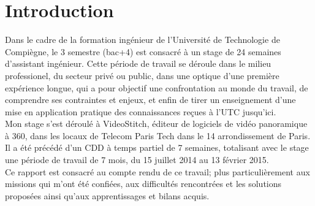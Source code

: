 \chapter*{Introduction}
Dans le cadre de la formation ingénieur de l'Université de Technologie de Compiègne,
le 3 semestre (bac+4) est consacré à un stage de 24 semaines d'assistant ingénieur.
Cette période de travail se déroule dans le milieu professionel, du secteur
privé ou public, dans une optique d'une première expérience longue, qui a pour
objectif une confrontation au monde du travail, de comprendre ses contraintes et 
enjeux, et enfin de tirer un enseignement d'une mise en application pratique des
connaissances reçues à l'UTC jusqu'ici.\\
\newline
Mon stage s'est déroulé à VideoStitch, éditeur de logiciels de vidéo panoramique
à 360\degree, dans les locaux de Telecom Paris Tech dans le 14 arrondissement de Paris. 
Il a été précédé d'un CDD à temps partiel de 7 semaines, totalisant avec le stage une période 
de travail de 7 mois, du 15 juillet 2014 au 13 février 2015.\\
\newline
Ce rapport est consacré au compte rendu de ce travail; plus particulièrement aux
missions qui m'ont été confiées, aux difficultés rencontrées et les solutions
proposées ainsi qu'aux apprentissages et bilans acquis.


